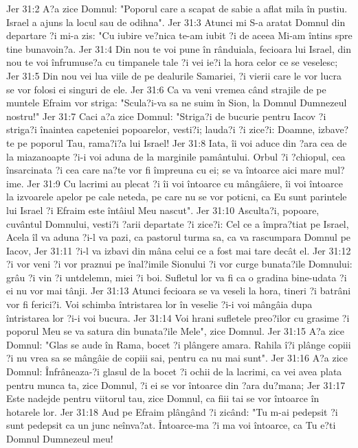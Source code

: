 Jer 31:2  A?a zice Domnul: "Poporul care a scapat de sabie a aflat mila în pustiu. Israel a ajuns la locul sau de odihna".
Jer 31:3  Atunci mi S-a aratat Domnul din departare ?i mi-a zis: "Cu iubire ve?nica te-am iubit ?i de aceea Mi-am întins spre tine bunavoin?a.
Jer 31:4  Din nou te voi pune în rânduiala, fecioara lui Israel, din nou te voi înfrumuse?a cu timpanele tale ?i vei ie?i la hora celor ce se veselesc;
Jer 31:5  Din nou vei lua viile de pe dealurile Samariei, ?i vierii care le vor lucra se vor folosi ei singuri de ele.
Jer 31:6  Ca va veni vremea când strajile de pe muntele Efraim vor striga: "Scula?i-va sa ne suim în Sion, la Domnul Dumnezeul nostru!"
Jer 31:7  Caci a?a zice Domnul: "Striga?i de bucurie pentru Iacov ?i striga?i înaintea capeteniei popoarelor, vesti?i; lauda?i ?i zice?i: Doamne, izbave?te pe poporul Tau, rama?i?a lui Israel!
Jer 31:8  Iata, îi voi aduce din ?ara cea de la miazanoapte ?i-i voi aduna de la marginile pamântului. Orbul ?i ?chiopul, cea însarcinata ?i cea care na?te vor fi împreuna cu ei; se va întoarce aici mare mul?ime.
Jer 31:9  Cu lacrimi au plecat ?i îi voi întoarce cu mângâiere, îi voi întoarce la izvoarele apelor pe cale neteda, pe care nu se vor poticni, ca Eu sunt parintele lui Israel ?i Efraim este întâiul Meu nascut".
Jer 31:10  Asculta?i, popoare, cuvântul Domnului, vesti?i ?arii departate ?i zice?i: Cel ce a împra?tiat pe Israel, Acela îl va aduna ?i-l va pazi, ca pastorul turma sa, ca va rascumpara Domnul pe Iacov,
Jer 31:11  ?i-l va izbavi din mâna celui ce a fost mai tare decât el.
Jer 31:12  ?i vor veni ?i vor praznui pe înal?imile Sionului ?i vor curge bunata?ile Domnului: grâu ?i vin ?i untdelemn, miei ?i boi. Sufletul lor va fi ca o gradina bine-udata ?i ei nu vor mai tânji.
Jer 31:13  Atunci fecioara se va veseli la hora, tineri ?i batrâni vor fi ferici?i. Voi schimba întristarea lor în veselie ?i-i voi mângâia dupa întristarea lor ?i-i voi bucura.
Jer 31:14  Voi hrani sufletele preo?ilor cu grasime ?i poporul Meu se va satura din bunata?ile Mele", zice Domnul.
Jer 31:15  A?a zice Domnul: "Glas se aude în Rama, bocet ?i plângere amara. Rahila î?i plânge copiii ?i nu vrea sa se mângâie de copiii sai, pentru ca nu mai sunt".
Jer 31:16  A?a zice Domnul: Înfrâneaza-?i glasul de la bocet ?i ochii de la lacrimi, ca vei avea plata pentru munca ta, zice Domnul, ?i ei se vor întoarce din ?ara du?mana;
Jer 31:17  Este nadejde pentru viitorul tau, zice Domnul, ca fiii tai se vor întoarce în hotarele lor.
Jer 31:18  Aud pe Efraim plângând ?i zicând: "Tu m-ai pedepsit ?i sunt pedepsit ca un junc neînva?at. Întoarce-ma ?i ma voi întoarce, ca Tu e?ti Domnul Dumnezeul meu!
